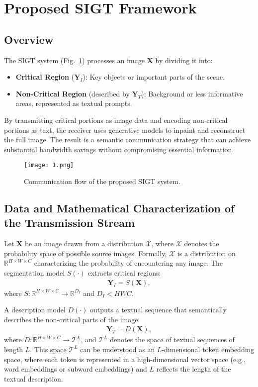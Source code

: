 \documentclass[conference]{IEEEtran}
\begin{document}
\section{Proposed SIGT Framework}

\subsection{Overview}
The SIGT system (Fig.~\ref{Fig.1}) processes an image $\bm{X}$ by dividing it into:
\begin{itemize}
    \item \textbf{Critical Region} ($\bm{Y}_I$): Key objects or important parts of the scene.
    \item \textbf{Non-Critical Region} (described by $\bm{Y}_T$): Background or less informative areas, represented as textual prompts.
\end{itemize}

By transmitting critical portions as image data and encoding non-critical portions as text, the receiver uses generative models to inpaint and reconstruct the full image. The result is a semantic communication strategy that can achieve substantial bandwidth savings without compromising essential information.

\begin{figure}[htbp]
    \centerline{\texttt{[image: 1.png]}}
    \caption{Communication flow of the proposed SIGT system.}
    \label{Fig.1}
\end{figure}

\subsection{Data and Mathematical Characterization of the Transmission Stream}

Let $\bm{X}$ be an image drawn from a distribution $\mathcal{X}$, where $\mathcal{X}$ denotes the probability space of possible source images. Formally, $\mathcal{X}$ is a distribution on $\mathbb{R}^{H\times W \times C}$ characterizing the probability of encountering any image. The segmentation model $S(\cdot)$ extracts critical regions:
\begin{align}
\bm{Y}_I = S(\bm{X}),
\end{align}
where $S: \mathbb{R}^{H \times W \times C} \to \mathbb{R}^{D_I}$ and $D_I < HWC$.

A description model $D(\cdot)$ outputs a textual sequence that semantically describes the non-critical parts of the image:
\begin{align}
\bm{Y}_T = D(\bm{X}),
\end{align}
where $D: \mathbb{R}^{H\times W \times C} \to \mathcal{T}^{L}$, and $\mathcal{T}^{L}$ denotes the space of textual sequences of length $L$. This space $\mathcal{T}^{L}$ can be understood as an $L$-dimensional token embedding space, where each token is represented in a high-dimensional vector space (e.g., word embeddings or subword embeddings) and $L$ reflects the length of the textual description.
\end{document}
